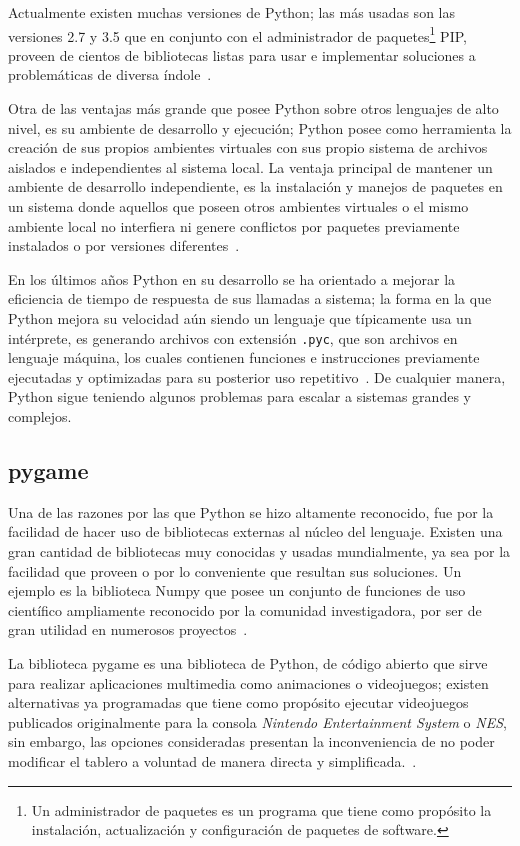 Actualmente existen muchas versiones de Python; las más usadas son 
las versiones 2.7 y 3.5 que en conjunto con el administrador de
paquetes\footnote{Un administrador de paquetes es un programa que tiene como
propósito la instalación, actualización y configuración de paquetes de software.}
PIP, proveen de cientos de bibliotecas listas para usar e implementar soluciones
a problemáticas de diversa índole~\cite{python}.

Otra de las ventajas más grande que posee Python sobre otros lenguajes de alto
nivel, es su ambiente de desarrollo
y ejecución; Python posee como herramienta la creación de sus propios ambientes
virtuales con sus propio sistema de archivos aislados e independientes al
sistema local. La ventaja principal de mantener un ambiente de desarrollo
independiente, es la instalación y manejos de paquetes en un sistema donde
aquellos que poseen otros ambientes virtuales o el mismo ambiente
local no interfiera ni genere conflictos por paquetes previamente instalados o
por versiones diferentes~\cite{venv}. %

En los últimos años Python en su desarrollo se ha orientado a mejorar la
eficiencia de tiempo de respuesta de sus llamadas a sistema; la forma en la que
Python mejora su velocidad aún siendo un lenguaje que típicamente usa un
intérprete, es generando archivos con extensión \texttt{.pyc}, que son archivos
en lenguaje máquina, los cuales contienen funciones e instrucciones previamente
ejecutadas y optimizadas para su posterior uso repetitivo~\cite{python}. De
cualquier manera, Python sigue teniendo algunos problemas para escalar a
sistemas grandes y complejos.


\subsection{pygame}

Una de las razones por las que Python se hizo altamente reconocido, fue por la
facilidad de hacer uso de bibliotecas externas al núcleo del lenguaje. Existen
una gran cantidad de bibliotecas muy conocidas y usadas mundialmente,
ya sea por la facilidad que proveen o por lo conveniente que resultan sus
soluciones. Un ejemplo es la
biblioteca Numpy que posee un conjunto de funciones de uso científico ampliamente
reconocido por la comunidad investigadora, por ser de gran utilidad en numerosos 
proyectos~\cite{numpy}.

La biblioteca pygame es una biblioteca de Python, de código abierto que sirve para realizar 
aplicaciones multimedia como animaciones o videojuegos; existen 
alternativas ya programadas que tiene como propósito ejecutar videojuegos 
publicados originalmente para la consola \textit{Nintendo Entertainment System} 
o \textit{NES}, sin embargo, las opciones consideradas presentan la inconveniencia de no poder 
modificar el tablero a voluntad de manera directa y simplificada.~\cite{gym-tetris,nespy}.

